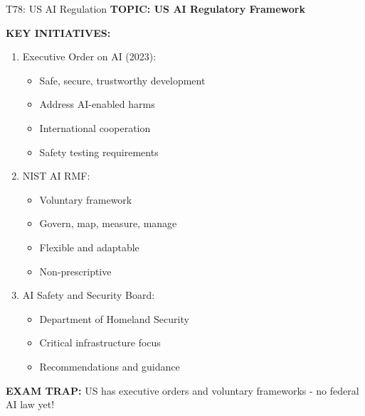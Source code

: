 \documentclass[8pt]{beamer}
\begin{document}
	\begin{frame}{T78: US AI Regulation}
		\fontsize{6.5}{7.5}\selectfont
		\textbf{TOPIC: US AI Regulatory Framework}
		
		\vspace{0.1cm}
		\textbf{KEY INITIATIVES:}
		\begin{enumerate}
			\item \textcolor{myblue}{Executive Order on AI (2023):}
			\begin{itemize}
				\item Safe, secure, trustworthy development
				\item Address AI-enabled harms
				\item International cooperation
				\item Safety testing requirements
			\end{itemize}
			\item \textcolor{myblue}{NIST AI RMF:}
			\begin{itemize}
				\item Voluntary framework
				\item Govern, map, measure, manage
				\item Flexible and adaptable
				\item Non-prescriptive
			\end{itemize}
			\item \textcolor{myblue}{AI Safety and Security Board:}
			\begin{itemize}
				\item Department of Homeland Security
				\item Critical infrastructure focus
				\item Recommendations and guidance
			\end{itemize}
		\end{enumerate}
		
		\textcolor{myred}{\textbf{EXAM TRAP:}} US has \textcolor{myblue}{executive orders and voluntary frameworks} - no federal AI law yet!
	\end{frame}
	
\end{document}
